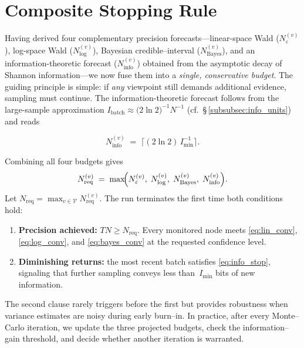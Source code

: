 
\section{Composite Stopping Rule}
\label{subsec:composite_rule}

Having derived four complementary precision forecasts—linear-space Wald ($N_{\varepsilon}^{(v)}$), log-space Wald ($N^{(v)}_{\log}$), Bayesian credible–interval ($N^{(v)}_{\mathrm{Bayes}}$), and an information-theoretic forecast ($N_{\mathrm{info}}^{(v)}$) obtained from the asymptotic decay of Shannon information—we now fuse them into a \emph{single, conservative budget}.  The guiding principle is simple: if \emph{any} viewpoint still demands additional evidence, sampling must continue.  The information-theoretic forecast follows from the large-sample approximation $I_{\text{batch}}\approx\bigl(2\ln 2\bigr)^{-1}N^{-1}$ (cf.\ §\,\ref{subsubsec:info_units}) and reads

\begin{equation}
  N_{\mathrm{info}}^{(v)}
  \;=\;
  \bigl\lceil (2\ln 2)\,I_{\min}^{-1} \bigr\rceil.
  \label{eq:n_info_node}
\end{equation}

Combining all four budgets gives
\begin{equation}
  N^{(v)}_{\text{req}} \;=\; \max\!\Bigl(N_{\varepsilon}^{(v)},\; N^{(v)}_{\log},\; N_{\mathrm{Bayes}}^{(v)},\; N_{\mathrm{info}}^{(v)}\Bigr).
  \label{eq:n_req_node}
\end{equation}
Let $N_{\text{req}}=\max_{v\in\mathcal{V}}N^{(v)}_{\text{req}}$.  The run
terminates the first time both conditions hold:
\begin{enumerate}
  \item \textbf{Precision achieved:} $T N \ge N_{\text{req}}$.  Every monitored
        node meets \eqref{eq:lin_conv}, \eqref{eq:log_conv}, and \eqref{eq:bayes_conv} at the
        requested confidence level.
  \item \textbf{Diminishing returns:} the most recent batch satisfies
        \eqref{eq:info_stop}, signaling that further sampling conveys less
        than~$I_{\min}$ bits of new information.
\end{enumerate}
The second clause rarely triggers before the first but provides robustness
when variance estimates are noisy during early burn--in. In practice, after every Monte--Carlo iteration, we  update the three projected budgets, check the information--gain threshold,
and decide whether another iteration is warranted.

